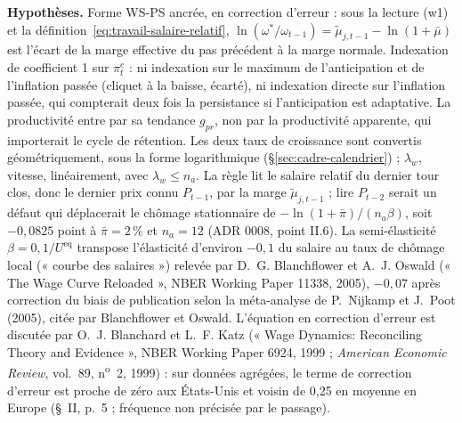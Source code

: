 \documentclass[11pt,a4paper]{article}
\newcommand{\hyp}{\par\noindent\textbf{Hypothèses.} }
\begin{document}
\begin{lecture}
\hyp Forme WS-PS ancrée, en correction d'erreur : sous la lecture (w1) et la définition~\eqref{eq:travail-salaire-relatif}, $\ln(\omega^{\ast}/\omega_{t-1}) = \tilde\mu_{j,t-1} - \ln(1 + \bar\mu)$ est l'écart de la marge effective du pas précédent à la marge normale. Indexation de coefficient 1 sur $\pi^e_t$ : ni indexation sur le maximum de l'anticipation et de l'inflation passée (cliquet à la baisse, écarté), ni indexation directe sur l'inflation passée, qui compterait deux fois la persistance si l'anticipation est adaptative. La productivité entre par sa tendance $g_{\mathit{pr}}$, non par la productivité apparente, qui importerait le cycle de rétention. Les deux taux de croissance sont convertis géométriquement, sous la forme logarithmique (\S\ref{sec:cadre-calendrier}) ; $\lambda_w$, vitesse, linéairement, avec $\lambda_w \le n_a$. La règle lit le salaire relatif du dernier tour clos, donc le dernier prix connu $P_{t-1}$, par la marge $\tilde\mu_{j,t-1}$ ; lire $P_{t-2}$ serait un défaut qui déplacerait le chômage stationnaire de $-\ln(1 + \bar\pi)/(n_a\beta)$, soit $-0{,}0825$ point à $\bar\pi = 2\,\%$ et $n_a = 12$ (ADR 0008, point II.6). La semi-élasticité $\beta = 0{,}1/U^{\mathrm{eq}}$ transpose l'élasticité d'environ $-0{,}1$ du salaire au taux de chômage local (« courbe des salaires ») relevée par D.~G. Blanchflower et A.~J. Oswald (« The Wage Curve Reloaded », NBER Working Paper 11338, 2005), $-0{,}07$ après correction du biais de publication selon la méta-analyse de P.~Nijkamp et J.~Poot (2005), citée par Blanchflower et Oswald. L'équation en correction d'erreur est discutée par O.~J. Blanchard et L.~F. Katz (« Wage Dynamics: Reconciling Theory and Evidence », NBER Working Paper 6924, 1999 ; \emph{American Economic Review}, vol.~89, n\textsuperscript{o}~2, 1999) : sur données agrégées, le terme de correction d'erreur est proche de zéro aux États-Unis et voisin de 0,25 en moyenne en Europe (\S~II, p.~5 ; fréquence non précisée par le passage).

\end{lecture}
\end{document}

